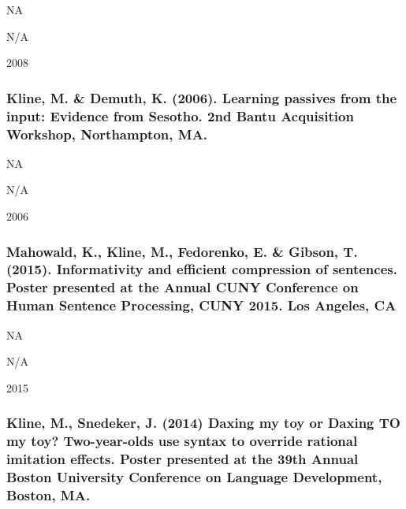 \documentclass[
]{article}
\begin{document}
NA

N/A

2008

\hypertarget{kline-m.-demuth-k.-2006.-learning-passives-from-the-input-evidence-from-sesotho.-2nd-bantu-acquisition-workshop-northampton-ma.}{%
\subsubsection{Kline, M. \& Demuth, K. (2006). Learning passives from
the input: Evidence from Sesotho. 2nd Bantu Acquisition Workshop,
Northampton,
MA.}\label{kline-m.-demuth-k.-2006.-learning-passives-from-the-input-evidence-from-sesotho.-2nd-bantu-acquisition-workshop-northampton-ma.}}

NA

N/A

2006

\hypertarget{mahowald-k.-kline-m.-fedorenko-e.-gibson-t.-2015.-informativity-and-efficient-compression-of-sentences.-poster-presented-at-the-annual-cuny-conference-on-human-sentence-processing-cuny-2015.-los-angeles-ca}{%
\subsubsection{Mahowald, K., Kline, M., Fedorenko, E. \& Gibson, T.
(2015). Informativity and efficient compression of sentences. Poster
presented at the Annual CUNY Conference on Human Sentence Processing,
CUNY 2015. Los Angeles,
CA}\label{mahowald-k.-kline-m.-fedorenko-e.-gibson-t.-2015.-informativity-and-efficient-compression-of-sentences.-poster-presented-at-the-annual-cuny-conference-on-human-sentence-processing-cuny-2015.-los-angeles-ca}}

NA

N/A

2015

\hypertarget{kline-m.-snedeker-j.-2014-daxing-my-toy-or-daxing-to-my-toy-two-year-olds-use-syntax-to-override-rational-imitation-effects.-poster-presented-at-the-39th-annual-boston-university-conference-on-language-development-boston-ma.}{%
\subsubsection{Kline, M., Snedeker, J. (2014) Daxing my toy or Daxing TO
my toy? Two-year-olds use syntax to override rational imitation effects.
Poster presented at the 39th Annual Boston University Conference on
Language Development, Boston,
MA.}\label{kline-m.-snedeker-j.-2014-daxing-my-toy-or-daxing-to-my-toy-two-year-olds-use-syntax-to-override-rational-imitation-effects.-poster-presented-at-the-39th-annual-boston-university-conference-on-language-development-boston-ma.}}
\end{document}
